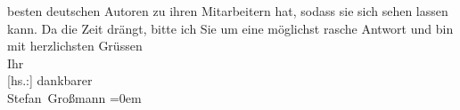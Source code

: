 \begin{ledgroupsized}[t]{13cm}
               besten deutschen Autoren zu ihren Mitarbeitern hat, sodass sie sich sehen lassen
               kann.\pend
           \pstart
           {\pb}Da die Zeit drängt, bitte ich Sie um eine
               möglichst rasche Antwort und bin\pend
           \pstart
           mit herzlichsten Grüssen{\\[\baselineskip]}Ihr{\\[\baselineskip]}{[}hs.:{]} dankbarer{\\[\baselineskip]}\spacefill\mbox{Stefan Großmann}\pend
           \leftskip=0em{}
         
         \endnumbering{}\end{ledgroupsized}  \newcommand{\dateiname}{L02378}\newcommand{\titel}{Stefan Großmann an Arthur Schnitzler, 26. 4. 1922}\newcommand{\editorInnen}{ Martin Anton Müller und Gerd-Hermann Susen}
      